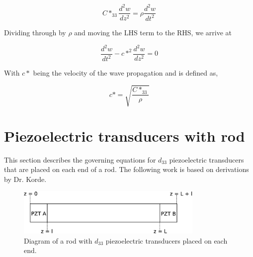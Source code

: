 \begin{equation}
C*_{33}\frac{d^2w}{dz^2} = \rho \frac{d^2w}{dt^2}
\end{equation}

Dividing through by $\rho$ and moving the LHS term to the RHS, we arrive at

\begin{equation}
\frac{d^2w}{dt^2} - c*^2 \frac{d^2w}{dz^2} = 0
\label{eq:waveEquationFin}
\end{equation}


With $c*$ being the velocity of the wave propagation and is defined as,

\begin{equation}
c* = \sqrt{\frac{C*_{33}}{\rho}}
\end{equation}

\section{Piezoelectric transducers with rod}

This section describes the governing equations for $d_{33}$ piezoelectric transducers that are placed on each end of a rod. The following work is based on derivations by Dr. Korde.

\begin{figure}[ht!]
\centering
\includegraphics[width=0.8\textwidth]{eps_pics/rodTrans.eps}
\caption{Diagram of a rod with $d_{33}$ piezoelectric transducers placed on each end.
	 \label{fig:rodTrans}} 
\end{figure}



